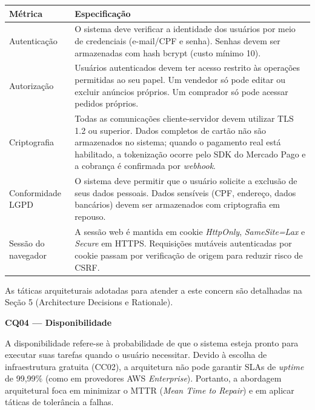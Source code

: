 \documentclass[12pt, a4paper]{article}
\begin{document}
\begin{longtable}{|p{4.5cm}|p{10cm}|}
\hline
\textbf{Métrica} & \textbf{Especificação} \\
\hline
Autenticação & O sistema deve verificar a identidade dos usuários por meio de credenciais (e-mail/CPF e senha). Senhas devem ser armazenadas com hash bcrypt (custo mínimo 10). \\
\hline
Autorização & Usuários autenticados devem ter acesso restrito às operações permitidas ao seu papel. Um vendedor só pode editar ou excluir anúncios próprios. Um comprador só pode acessar pedidos próprios. \\
\hline
Criptografia & Todas as comunicações cliente-servidor devem utilizar TLS 1.2 ou superior. Dados completos de cartão não são armazenados no sistema; quando o pagamento real está habilitado, a tokenização ocorre pelo SDK do Mercado Pago e a cobrança é confirmada por \textit{webhook}. \\
\hline
Conformidade LGPD & O sistema deve permitir que o usuário solicite a exclusão de seus dados pessoais. Dados sensíveis (CPF, endereço, dados bancários) devem ser armazenados com criptografia em repouso. \\
\hline
Sessão do navegador & A sessão web é mantida em cookie \textit{HttpOnly}, \textit{SameSite=Lax} e \textit{Secure} em HTTPS. Requisições mutáveis autenticadas por cookie passam por verificação de origem para reduzir risco de CSRF. \\
\hline
\end{longtable}

\noindent As táticas arquiteturais adotadas para atender a este concern são detalhadas na Seção 5 (Architecture Decisions e Rationale).

\vspace{0.5cm}

\noindent\textbf{CQ04 --- Disponibilidade}

A disponibilidade refere-se à probabilidade de que o sistema esteja pronto para executar suas tarefas quando o usuário necessitar. Devido à escolha de infraestrutura gratuita (CC02), a arquitetura não pode garantir SLAs de \textit{uptime} de 99,99\% (como em provedores AWS \textit{Enterprise}). Portanto, a abordagem arquitetural foca em minimizar o MTTR (\textit{Mean Time to Repair}) e em aplicar táticas de tolerância a falhas.
\end{document}
